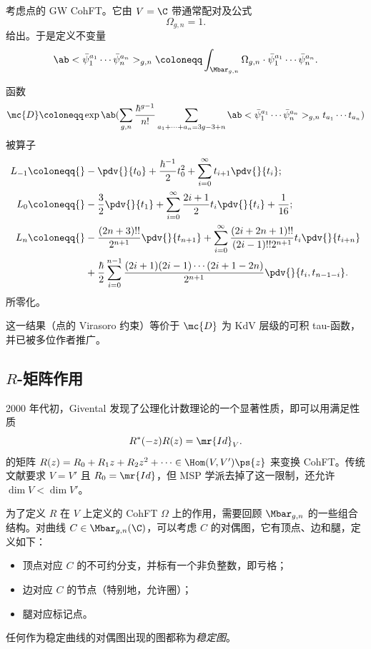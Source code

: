 \begin{exm}
    考虑点的 GW CohFT。它由 \(V = \C\) 带通常配对及公式
    \[ \Omega_{g,n} = 1. \]
    给出。于是定义不变量
    \[ \ab<\bar{\psi}_1^{a_1} \cdots \bar{\psi}_n^{a_n}>_{g,n} \coloneqq \int_{\Mbar_{g,n}} \Omega_{g,n} \cdot \bar{\psi}_1^{a_1} \cdots \bar{\psi}_n^{a_n}. \]
    \begin{thm}
        函数
        \[ \mc{D} \coloneqq \exp \ab(\sum_{g,n} \frac{\hbar^{g-1}}{n!}\sum_{a_1 + \cdots + a_n = 3g-3+n} \ab<\bar{\psi}_1^{a_1} \cdots \bar{\psi}_n^{a_n}>_{g,n} t_{a_1}\cdots t_{a_n}) \]
        被算子
        \begin{align*}
            L_{-1} \coloneqq{}& -\pdv{}{t_0} + \frac{\hbar^{-1}}{2} t_0^2 + \sum_{i=0}^{\infty} t_{i+1} \pdv{}{t_i};\\
            L_0 \coloneqq{}& -\frac{3}{2} \pdv{}{t_1} + \sum_{i=0}^{\infty} \frac{2i+1}{2} t_i \pdv{}{t_i} + \frac{1}{16};\\
            L_n \coloneqq{}& -\frac{(2n+3)!!}{2^{n+1}} \pdv{}{t_{n+1}} + \sum_{i=0}^{\infty} \frac{(2i+2n+1)!!}{(2i-1)!! 2^{n+1}} t_i \pdv{}{t_{i+n}} \\
            &+ \frac{\hbar}{2} \sum_{i=0}^{n-1} \frac{(2i+1) (2i-1) \cdots (2i+1-2n)}{2^{n+1}} \pdv{}{t_i,t_{n-1-i}}.
        \end{align*}
        所零化。
    \end{thm}
\end{exm}

\begin{rmk}
    这一结果（点的 Virasoro 约束）等价于 \(\mc{D}\) 为 KdV 层级的可积 tau-函数，并已被多位作者推广。
\end{rmk}



\subsection{$R$-矩阵作用}%
\label{sub:R-matrix action}

2000 年代初，Givental 发现了公理化计数理论的一个显著性质，即可以用满足性质
\[ R^*(-z) R(z) = \mr{Id}_V. \]
的矩阵 \(R(z) = R_0 + R_1 z + R_2 z^2 + \cdots \in \Hom(V, V')\ps{z}\) 来变换 CohFT。传统文献要求 \(V = V'\) 且 \(R_0 = \mr{Id}\)，但 MSP 学派去掉了这一限制，还允许 \(\dim V < \dim V'\)。

为了定义 \(R\) 在 \(V\) 上定义的 CohFT \(\Omega\) 上的作用，需要回顾 \(\Mbar_{g,n}\) 的一些组合结构。对曲线 \(C\in \Mbar_{g,n}(\C)\)，可以考虑 \(C\) 的对偶图，它有顶点、边和腿，定义如下：
\begin{itemize}
    \item 顶点对应 \(C\) 的不可约分支，并标有一个非负整数，即亏格；
    \item 边对应 \(C\) 的节点（特别地，允许圈）；
    \item 腿对应标记点。
\end{itemize}
任何作为稳定曲线的对偶图出现的图都称为\textit{稳定图}。

